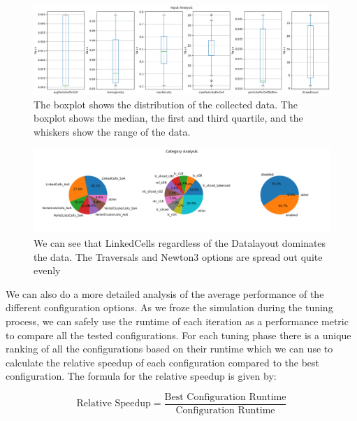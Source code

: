 \begin{figure}[H]
    \centering
    \includegraphics[width=\columnwidth,trim={0 0 0 0.5cm},clip]{figures/DataAnalytics/input_analysis.png}
    \caption[Boxplot of the collected Dataset]{The boxplot shows the distribution of the collected data. The boxplot shows the median, the first and third quartile, and the whiskers show the range of the data.}

    \label{fig:inputAnalysisBoxplot}
\end{figure}


\begin{figure}[H]
    \centering
    \includegraphics[width=\columnwidth,trim={1cm 2cm 2cm 2cm},clip]{figures/DataAnalytics/traversal_pie_chart.png}
    \caption[Pi Charts of nominal values of the collected Dataset]{ We can see that LinkedCells regardless of the Datalayout dominates the data. The Traversals and Newton3 options are spread out quite evenly}
    \label{fig:inputAnalysisPiChart}
\end{figure}

We can also do a more detailed analysis of the average performance of the different configuration options. As we froze the simulation during the tuning process, we can safely use the runtime of each iteration as a performance metric to compare all the tested configurations. For each tuning phase there is a unique ranking of all the configurations based on their runtime which we can use to calculate the relative speedup of each configuration compared to the best configuration. The formula for the relative speedup is given by:

\begin{equation}
    \text{Relative Speedup} = \frac{\text{Best Configuration Runtime}}{\text{Configuration Runtime}}
\end{equation}

